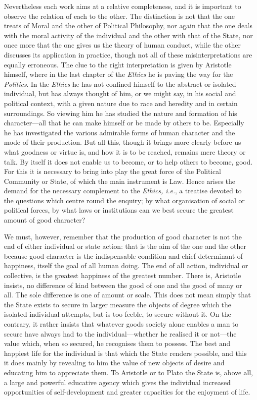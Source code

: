 Nevertheless each work aims at a relative completeness, and it is important to
observe the relation of each to the other. The distinction is not that the one
treats of Moral and the other of Political Philosophy, nor again that the one
deals with the moral activity of the individual and the other with that of the
State, nor once more that the one gives us the theory of human conduct, while
the other discusses its application in practice, though not all of these
misinterpretations are equally erroneous. The clue to the right interpretation
is given by Aristotle himself, where in the last chapter of the \emph{Ethics}
he is paving the way for the \emph{Politics}. In the \emph{Ethics} he has not
confined himself to the abstract or isolated individual, but has always thought
of him, or we might say, in his social and political context, with a given
nature due to race and heredity and in certain surroundings. So viewing him he
has studied the nature and formation of his character—all that he can
make himself or be made by others to be. Especially he has investigated the
various admirable forms of human character and the mode of their production.
But all this, though it brings more clearly before us what goodness or virtue
is, and how it is to be reached, remains mere theory or talk. By itself it does
not enable us to become, or to help others to become, good. For this it is
necessary to bring into play the great force of the Political Community or
State, of which the main instrument is Law. Hence arises the demand for the
necessary complement to the \emph{Ethics, i.e.}, a treatise devoted to the
questions which centre round the enquiry; by what organisation of social or
political forces, by what laws or institutions can we best secure the greatest
amount of good character?

We must, however, remember that the production of good character is not the end
of either individual or state action: that is the aim of the one and the other
because good character is the indispensable condition and chief determinant of
happiness, itself the goal of all human doing. The end of all action,
individual or collective, is the greatest happiness of the greatest number.
There is, Aristotle insists, no difference of kind between the good of one and
the good of many or all. The sole difference is one of amount or scale. This
does not mean simply that the State exists to secure in larger measure the
objects of degree which the isolated individual attempts, but is too feeble, to
secure without it. On the contrary, it rather insists that whatever goods
society alone enables a man to secure have always had to the
individual—whether he realised it or not—the value which, when so
secured, he recognises them to possess. The best and happiest life for the
individual is that which the State renders possible, and this it does mainly by
revealing to him the value of new objects of desire and educating him to
appreciate them. To Aristotle or to Plato the State is, above all, a large and
powerful educative agency which gives the individual increased opportunities of
self-development and greater capacities for the enjoyment of life.

